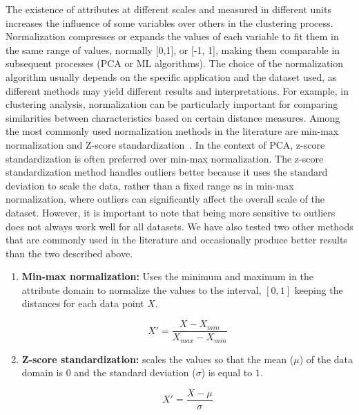 The existence of attributes at different scales and measured in different units increases the influence of some variables over others in the clustering process. Normalization compresses or expands the values of each variable to fit them in the same range of values, normally [0,1], or [-1, 1], making them comparable in subsequent processes (PCA or ML algorithms). The choice of the normalization algorithm usually depends on the specific application and the dataset used, as different methods may yield different results and interpretations. For example, in clustering analysis, normalization can be particularly important for comparing similarities between characteristics based on certain distance measures. Among the most commonly used normalization methods in the literature are min-max normalization and Z-score standardization~\cite{henderi2021comparison,patro2015normalization}. In the context of PCA, z-score standardization is often preferred over min-max normalization. The z-score standardization method handles outliers better because it uses the standard deviation to scale the data, rather than a fixed range as in min-max normalization, where outliers can significantly affect the overall scale of the dataset. However, it is important to note that being more sensitive to outliers does not always work well for all datasets. We have also tested two other methods that are commonly used in the literature \cite{polat2018novel,ayub2020impact} and occasionally produce better results than the two described above.

\begin{enumerate}
    \item \textbf{Min-max normalization:} Uses the minimum and maximum in the attribute domain to normalize the values to the interval, $[0,1]$ keeping the distances for each data point $X$.
    {\color{black} 
    
    \begin{equation}
    X'=\frac{X-X_{min}}{X_{max}-X_{min}}
    \end{equation}
     }
    
    \item \textbf{Z-score standardization:} scales the values so that the mean ($\mu$) of the data domain is $0$ and the standard deviation ($\sigma$) is equal to $1$.

 
    \begin{equation}
    X'=\frac{X-\mu}{\sigma}
    \end{equation}
    
\end{enumerate}

